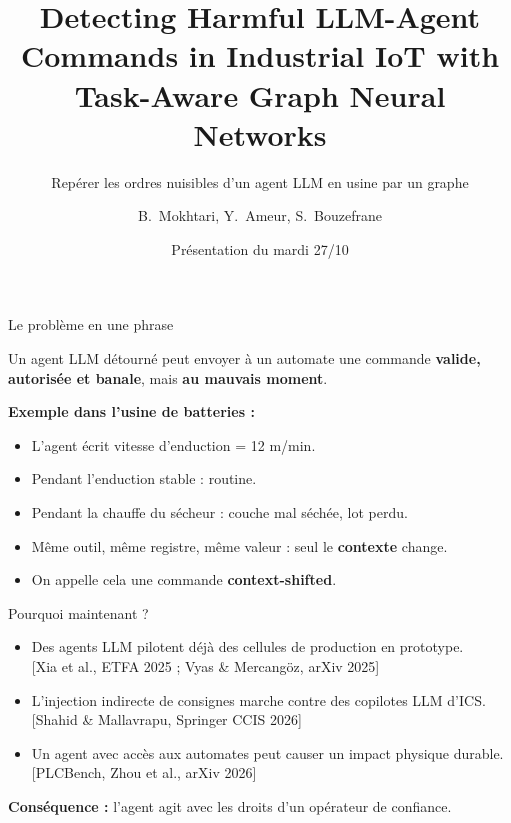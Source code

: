 \documentclass[aspectratio=169,11pt]{beamer}
\title{Detecting Harmful LLM-Agent Commands in Industrial IoT with Task-Aware Graph Neural Networks}
\subtitle{Repérer les ordres nuisibles d'un agent LLM en usine par un graphe}
\author{B.~Mokhtari, Y.~Ameur, S.~Bouzefrane}
\institute{IEEE IoT Journal, numéro spécial \og Graph Representation Learning for IoT\fg{} -- dépôt le 30/11/2026}
\date{Présentation du mardi 27/10}
\newcommand{\src}[1]{{\scriptsize\color{gray}[#1]}}
\begin{document}
\maketitle

\begin{frame}{Le problème en une phrase}
\begin{alertblock}{}
Un agent LLM détourné peut envoyer à un automate une commande \textbf{valide, autorisée et banale}, mais \textbf{au mauvais moment}.
\end{alertblock}
\vspace{2mm}
\textbf{Exemple dans l'usine de batteries :}
\begin{itemize}
\item L'agent écrit \og vitesse d'enduction = 12 m/min\fg{}.
\item Pendant l'enduction stable : routine.
\item Pendant la chauffe du sécheur : couche mal séchée, lot perdu.
\item Même outil, même registre, même valeur : seul le \textbf{contexte} change.
\item On appelle cela une commande \textbf{\og context-shifted\fg{}}.
\end{itemize}
\end{frame}

\begin{frame}{Pourquoi maintenant ?}
\begin{itemize}
\item Des agents LLM pilotent déjà des cellules de production en prototype.\\
  \src{Xia et al., ETFA 2025 ; Vyas \& Mercangöz, arXiv 2025}
\item L'injection indirecte de consignes marche contre des copilotes LLM d'ICS.\\
  \src{Shahid \& Mallavrapu, Springer CCIS 2026}
\item Un agent avec accès aux automates peut causer un impact physique durable.\\
  \src{PLCBench, Zhou et al., arXiv 2026}
\end{itemize}
\vspace{3mm}
\textbf{Conséquence :} l'agent agit avec les droits d'un opérateur de confiance.
\end{frame}
\end{document}

